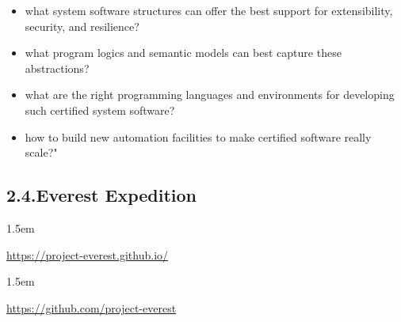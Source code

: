 \documentclass[12pt,twoside]{article}
\begin{document}
\begin{itemize}[noitemsep,topsep=\mdcompacttopsep]%

\item{}what system software structures can offer the best support for extensibility, security, and resilience?%

\item{}what program logics and semantic models can best capture these abstractions?%

\item{}what are the right programming languages and environments for developing such certified system software?%

\item{}how to build new automation facilities to make certified software really scale?"%
\end{itemize}%

\subsection{2.4.\hspace*{0.5em}Everest Expedition}\label{sec-everest-expedition}%

\begin{mddefinitions}%


\begin{mdbmarginx}{}{}{}{1.5em}%
\begin{mddefdata}%
\href{https://project-everest.github.io/}{{\ttfamily https://\hspace{0pt}project-\hspace{0pt}everest.\hspace{0pt}github.\hspace{0pt}io/\hspace{0pt}}}
\end{mddefdata}%
\end{mdbmarginx}%


\begin{mdbmarginx}{}{}{}{1.5em}%
\begin{mddefdata}%
\href{https://github.com/project-everest}{{\ttfamily https://\hspace{0pt}github.\hspace{0pt}com/\hspace{0pt}project-\hspace{0pt}everest}}%
\end{mddefdata}%
\end{mdbmarginx}%
\end{mddefinitions}%
\end{document}
